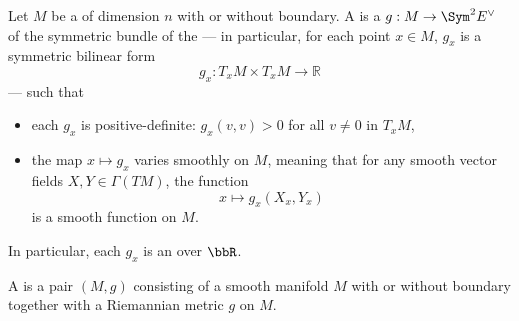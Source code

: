 \begin{definition} \label{definition:riemannian_metric_of_a_smooth_manifold_and_a_riemannian_manifold} 
    Let $M$ be a  of dimension $n$ with or without boundary.
    A  is a  $g: M \to \Sym^2 E^\vee$ of the symmetric bundle  of the  --- in particular, for each point $x \in M$, $g_x$ is a symmetric bilinear form 
    $$ g_x: T_x M \times T_x M \to \mathbb{R} $$ --- such that 
    \begin{itemize}
        \item each $g_x$ is positive-definite: $g_x(v,v) > 0$ for all $v \neq 0$ in $T_x M$,
        \item the map $x \mapsto g_x$ varies smoothly on $M$, meaning that for any smooth vector fields $X, Y \in \Gamma(TM)$, the function 
        $$
        x \mapsto g_x(X_x, Y_x)
        $$
        is a smooth function on $M$.
    \end{itemize}
    In particular, each $g_x$ is an  over $\bbR$.

    A  is a pair $(M, g)$ consisting of a smooth manifold $M$ with or without boundary together with a Riemannian metric $g$ on $M$.
\end{definition}